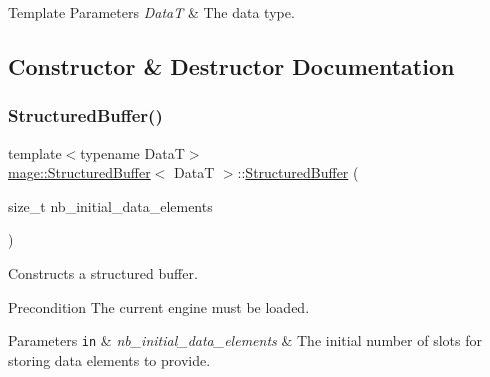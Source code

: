 \begin{DoxyTemplParams}{Template Parameters}
{\em DataT} & The data type. \\
\hline
\end{DoxyTemplParams}


\subsection{Constructor \& Destructor Documentation}
\hypertarget{structmage_1_1_structured_buffer_ad384318eca9a617f61f81472ea68f32e}{}\label{structmage_1_1_structured_buffer_ad384318eca9a617f61f81472ea68f32e} 
\subsubsection{\texorpdfstring{Structured\+Buffer()}{StructuredBuffer()}\hspace{0.1cm}{\footnotesize\ttfamily [1/4]}}
{\footnotesize\ttfamily template$<$typename DataT$>$ \\
\hyperlink{structmage_1_1_structured_buffer}{mage\+::\+Structured\+Buffer}$<$ DataT $>$\+::\hyperlink{structmage_1_1_structured_buffer}{Structured\+Buffer} (\begin{DoxyParamCaption}\item[{size\+\_\+t}]{nb\+\_\+initial\+\_\+data\+\_\+elements }\end{DoxyParamCaption})\hspace{0.3cm}{\ttfamily [explicit]}}

Constructs a structured buffer.

\begin{DoxyPrecond}{Precondition}
The current engine must be loaded. 
\end{DoxyPrecond}

\begin{DoxyParams}[1]{Parameters}
\mbox{\tt in}  & {\em nb\+\_\+initial\+\_\+data\+\_\+elements} & The initial number of slots for storing data elements to provide. \\
\hline
\end{DoxyParams}
\hypertarget{structmage_1_1_structured_buffer_a9ba747c0666b96c17e3711266ee74aa0}{}\label{structmage_1_1_structured_buffer_a9ba747c0666b96c17e3711266ee74aa0} 
